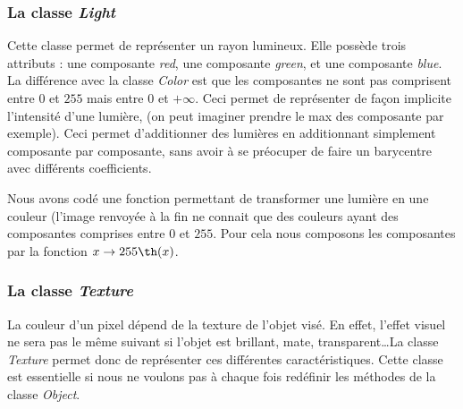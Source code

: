 \documentclass{article}
\begin{document}
\subsubsection{La classe \emph{Light}}
Cette classe permet de représenter un rayon lumineux. Elle possède trois attributs : une composante \emph{red}, une composante \emph{green}, et une composante \emph{blue}.
La différence avec la classe \emph{Color} est que les composantes ne sont pas comprisent entre $0$ et $255$ mais entre $0$ et $+\infty$.
Ceci permet de représenter de façon implicite l'intensité d'une lumière, (on peut imaginer prendre le max des composante par exemple). Ceci permet d'additionner des lumières en additionnant simplement composante par composante, sans avoir à se préocuper de faire un barycentre avec différents coefficients. 


Nous avons codé une fonction permettant de transformer une lumière en une couleur (l'image renvoyée à la fin ne connait que des couleurs ayant des composantes comprises entre $0$ et $255$. Pour cela nous composons les composantes par la fonction $x \rightarrow 255\th(x)$. 

\subsubsection{La classe \emph{Texture}}
	La couleur d'un pixel dépend de la texture de l'objet visé. En effet, l'effet visuel ne sera pas le même suivant si l'objet est brillant, mate, transparent\dots La classe \emph{Texture} permet donc de représenter ces différentes caractéristiques. Cette classe est essentielle si nous ne voulons pas à chaque fois redéfinir les méthodes de la classe \emph{Object}. 
\end{document}
